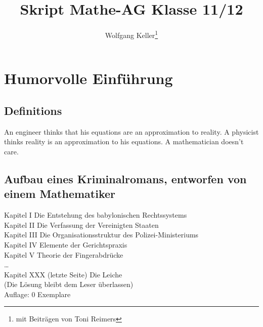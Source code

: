 \documentclass[10pt]{scrbook}
\author{Wolfgang Keller\footnote{mit Beiträgen von Toni Reimers}}
\title{Skript Mathe-AG Klasse 11/12}
\begin{document}
\maketitle
\newtheorem{Def}{Definition}
\newtheorem{Le}[Def]{Lemma}
\newtheorem{Sa}[Def]{Satz}
\newtheorem{Kor}[Def]{Korollar}
\newtheorem{Pro}[Def]{Problem}
\newtheorem{Bem}[Def]{Bemerkung}
\newtheorem{Bsp}[Def]{Beispiel}
\newtheorem{Auf}[Def]{Aufgabe}
\newtheorem{Loe}[Def]{Lösung}
\newcommand{\Ker}{\operatorname{Kern}}
\newcommand{\bild}{\operatorname{Bild}}
\newcommand{\ord}{\operatorname{o}}
\newcommand{\id}{\operatorname{id}}
\newcommand{\sgn}{\operatorname{sgn}}
\newcommand{\spr}{\operatorname{spr}}
\newcommand{\conv}{\operatorname{conv}}
\newcommand{\cond}{\operatorname{cond}}
\newcommand{\lin}{\operatorname{lin}}
\newcommand{\rang}{\operatorname{Rang}}
\newcommand{\capa}{\operatorname{cap}}
\newcommand{\val}{\operatorname{val}}
\newenvironment{bew}{\begin{proof}[Beweis]}{\end{proof}}
\tableofcontents

\chapter{Humorvolle Einführung}

\section{Definitions}

An engineer thinks that his equations are an approximation to reality. A physicist thinks reality is an approximation to his equations. A mathematician doesn't care. 

\section{Aufbau eines Kriminalromans, entworfen von einem Mathematiker}

Kapitel I   Die Entstehung des babylonischen Rechtssystems \\
Kapitel II   Die Verfassung der Vereinigten Staaten \\
Kapitel III   Die Organisationsstruktur des Polizei-Ministeriums \\
Kapitel IV   Elemente der Gerichtspraxis \\
Kapitel V   Theorie der Fingerabdrücke \\
\ldots \\
Kapitel XXX   (letzte Seite) Die Leiche \\
(Die Lösung bleibt dem Leser überlassen) \\
Auflage: 0 Exemplare
\end{document}
